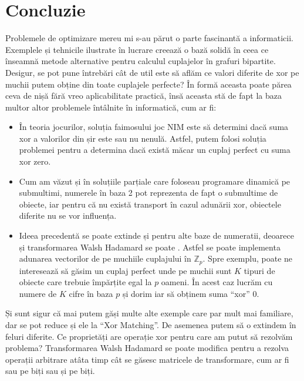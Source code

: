 \chapter{Concluzie}

Problemele de optimizare mereu mi s-au părut o parte fascinantă a informaticii.
Exemplele și tehnicile ilustrate în lucrare creează o bază solidă în ceea ce
înseamnă metode alternative pentru calculul cuplajelor în grafuri bipartite.
Desigur, se pot pune întrebări cât de util este să aflăm ce valori diferite
de xor pe muchii putem obține din toate cuplajele perfecte? În formă aceasta
poate părea ceva de nișă fără vreo aplicabilitate practică, însă aceasta stă de
fapt la baza multor altor problemele întâlnite în informatică, cum ar fi:

\begin{itemize}
  \item În teoria jocurilor, soluția faimosului joc NIM este să determini dacă
    suma xor a valorilor din șir este sau nu nenulă. Astfel, putem folosi soluția
    problemei pentru a determina dacă există măcar un cuplaj perfect cu suma xor zero.

  \item Cum am văzut și în soluțiile parțiale care foloseau programare dinamică pe
    submultimi, numerele în baza 2 pot reprezenta de fapt o submultime de obiecte,
    iar pentru că nu există transport în cazul adunării xor, obiectele diferite nu
    se vor influența.

  \item Ideea precedentă se poate extinde și pentru alte baze de numeratii, deoarece
    și transformarea Walsh Hadamard se poate \cite{whtbase}. Astfel se poate implementa
    adunarea vectorilor de pe muchiile cuplajului în $\mathbb{Z}_p$. Spre exemplu,
    poate ne interesează să găsim un cuplaj perfect unde pe muchii sunt $K$ tipuri
    de obiecte care trebuie împărțite egal la $p$ oameni. În acest caz lucrăm cu
    numere de $K$ cifre în baza $p$ și dorim iar să obținem suma ``xor'' 0.
\end{itemize}

Și sunt sigur că mai putem găși multe alte exemple care par mult mai familiare,
dar se pot reduce și ele la ``Xor Matching''. De asemenea putem să o extindem în
feluri diferite. Ce proprietăți are operație xor pentru care am putut să rezolvăm
problema? Transformarea Walsh Hadamard se poate modifica pentru a rezolva operații
arbitrare atâta timp cât se găsesc matricele de transformare, cum ar fi sau pe biți
sau și pe biți.

